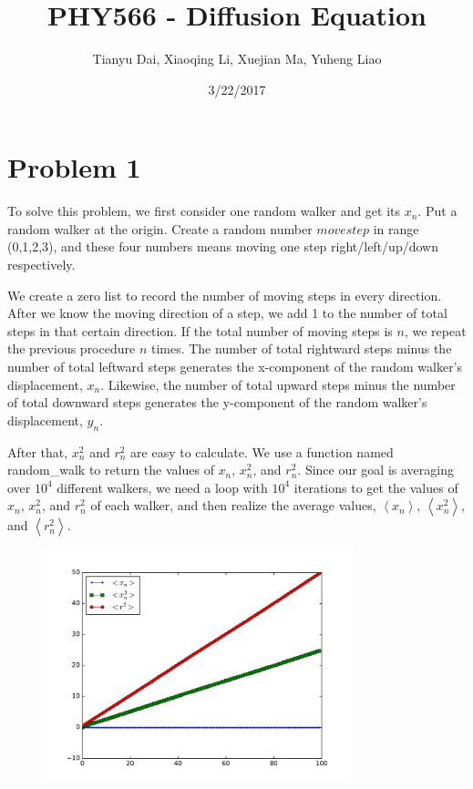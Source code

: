 \documentclass{article}
\author{Tianyu Dai, Xiaoqing Li, Xuejian Ma, Yuheng Liao }
\title{PHY566 - Diffusion Equation}
\begin{document}
\date{3/22/2017}
\maketitle
\section{Problem 1}
\quad To solve this problem, we first consider one random walker and get its $x_{n}$. Put a
random walker at the origin. Create a random number $movestep$ in range
(0,1,2,3), and these four numbers means moving one step right/left/up/down
respectively.

We create a zero list to record the number of moving steps in every
direction. After we know the moving direction of a step, we add 1 to the number of
total steps in that certain direction. If the total number of moving
steps is $n$, we repeat the previous procedure $n$ times. The number of
total rightward steps minus the number of total leftward steps generates the
x-component of the random walker's displacement, $x_{n}$. Likewise, the
number of total upward steps minus the number of total downward steps
generates the y-component of the random walker's displacement, $y_{n}$.

After that, $x_{n}^{2}$ and $r_{n}^{2}$ are easy to calculate. We use a
function named random\_walk to return the values of $x_{n}$,  $x_{n}^{2}$,
and $r_{n}^{2}$. Since our goal is averaging over $10^{4}$ different
walkers, we need a loop with $10^{4}$ iterations to get the values of $%
x_{n}$, $x_{n}^{2}$, and $r_{n}^{2}$ of each walker, and then realize the
average values, $\left\langle x_{n}\right\rangle $, $\left\langle
x_{n}^{2}\right\rangle $, and $\left\langle r_{n}^{2}\right\rangle $.
\begin{figure}[!ht]
	\centering
\includegraphics[width=0.8\textwidth]{./RandomWalk.pdf}
\end{figure}
\end{document}
